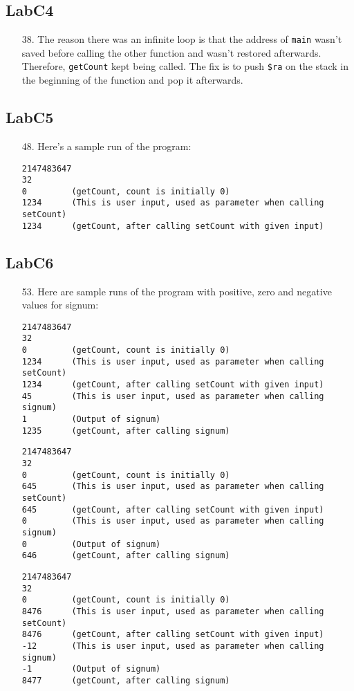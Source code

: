 \documentclass{article}
\begin{document}
\subsection{LabC4}
\begin{enumerate}
\item[38. ] The reason there was an infinite loop is that the address of \verb$main$ wasn't saved before calling the other function and wasn't restored afterwards. Therefore, \verb$getCount$ kept being called. The fix is to push \verb#$ra# on the stack in the beginning of the function and pop it afterwards.
\end{enumerate}

\subsection{LabC5}
\begin{enumerate}
\item[48. ] Here's a sample run of the program:
\begin{verbatim}
2147483647
32
0         (getCount, count is initially 0)
1234      (This is user input, used as parameter when calling setCount)
1234      (getCount, after calling setCount with given input)
\end{verbatim}
\end{enumerate}

\subsection{LabC6}
\begin{enumerate}
\item[53. ] Here are sample runs of the program with positive, zero and negative values for signum:
\begin{verbatim}
2147483647
32
0         (getCount, count is initially 0)
1234      (This is user input, used as parameter when calling setCount)
1234      (getCount, after calling setCount with given input)
45        (This is user input, used as parameter when calling signum)
1         (Output of signum)
1235      (getCount, after calling signum)
\end{verbatim}
\begin{verbatim}
2147483647
32
0         (getCount, count is initially 0)
645       (This is user input, used as parameter when calling setCount)
645       (getCount, after calling setCount with given input)
0         (This is user input, used as parameter when calling signum)
0         (Output of signum)
646       (getCount, after calling signum)
\end{verbatim}
\begin{verbatim}
2147483647
32
0         (getCount, count is initially 0)
8476      (This is user input, used as parameter when calling setCount)
8476      (getCount, after calling setCount with given input)
-12       (This is user input, used as parameter when calling signum)
-1        (Output of signum)
8477      (getCount, after calling signum)
\end{verbatim}
\end{enumerate}
\end{document}
